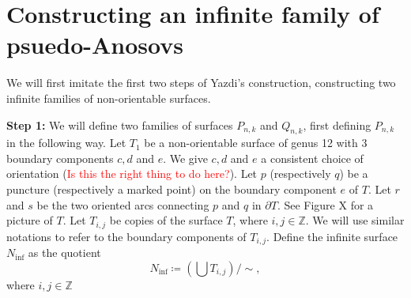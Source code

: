 \section{Constructing an infinite family of psuedo-Anosovs}
\label{sec:constr-an-infin}

We will first imitate the first two steps of Yazdi's construction, constructing two infinite families of non-orientable surfaces.

\textbf{Step 1:} We will define two families of surfaces $P_{n,k}$ and $Q_{n,k}$, first defining $P_{n,k}$ in the following way. Let $T_1$ be a non-orientable surface of genus 12 with 3 boundary components $c,d$ and $e$. We give $c, d$ and $e$ a consistent choice of orientation (\textcolor{red}{Is this the right thing to do here?}). Let $p$ (respectively $q$) be a puncture (respectively a marked point) on the boundary component $e$ of $T$. Let $r$ and $s$ be the two oriented arcs connecting $p$ and $q$ in $\partial T$. See Figure X for a picture of $T$. Let $T_{i,j}$ be copies of the surface $T$, where $i,j \in \mathbb{Z}$. We will use similar notations to refer to the boundary components of $T_{i,j}$. Define the infinite surface $N_{\inf}$ as the quotient $$N_{\inf} \coloneqq \left( \bigcup T_{i,j} \right)/\sim,$$ where $i,j \in \mathbb{Z}$